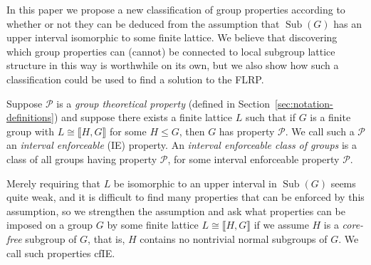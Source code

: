 \documentclass{gen-j-l}
\newcommand{\lb}{\ensuremath{\llbracket}}
\newcommand{\rb}{\ensuremath{\rrbracket}}
\newcommand{\<}{\ensuremath{\langle}}
\renewcommand{\>}{\ensuremath{\rangle}}
\theoremstyle{plain}
\theoremstyle{definition}
\theoremstyle{remark}
\numberwithin{theorem}{section}
\numberwithin{claim}{section}
\numberwithin{equation}{section}
\numberwithin{conjecture}{section}
\newcommand{\defn}[1]{\emph{#1}}
\renewcommand{\leq}{\ensuremath{\leqslant}}
\newcommand{\Sub}{\ensuremath{\operatorname{Sub}}}
\newcommand{\2}{\ensuremath{\mathbf{2}}}
\newcommand{\3}{\ensuremath{\mathbf{3}}}
\newcommand{\cP}{\ensuremath{\mathcal{P}}}
\newcommand{\IE}{{\small IE}}
\begin{document}
In this paper we propose a new classification of group properties according to
whether or not they can be deduced from the assumption that $\Sub(G)$ has an upper
interval isomorphic to some finite lattice.  We believe that discovering which 
group properties can (cannot) be connected to local subgroup lattice
structure in this way is worthwhile on its own, but we also show
how such a classification could be used to find a solution to the \acs{FLRP}. 

Suppose $\cP$ is a \emph{group theoretical property} 
(defined in Section~\ref{sec:notation-definitions}) 
and suppose there exists a finite lattice $L$ such that if $G$ is a finite group
with $L \cong \lb H,G \rb$ for some $H\leq G$, then $G$ has property $\cP$.  We call
such a  $\cP$ an \emph{interval enforceable} (\IE) property.  
An \defn{interval enforceable class of groups} is a class of all groups having
property $\cP$, for some interval enforceable property $\cP$.

Merely requiring that $L$ be isomorphic to an upper interval in $\Sub(G)$ seems quite
weak, and it is difficult to find many properties that can be enforced by this
assumption,
so we strengthen the assumption and ask what properties can be imposed on a
group $G$ by some finite lattice $L\cong\lb H,G \rb$ if we assume $H$ is a \emph{core-free}
subgroup of $G$, that is, $H$ contains no nontrivial normal subgroups of $G$.  
We call such properties \ac{cfIE}.
\end{document}
